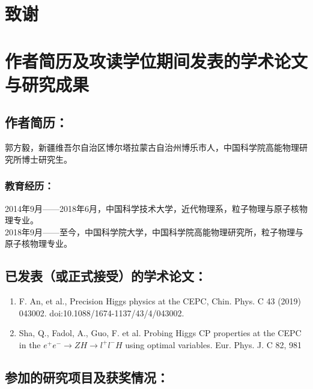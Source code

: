 \chapter[致谢]{致\quad 谢}%

\chapter{作者简历及攻读学位期间发表的学术论文与研究成果}

\section*{作者简历：}
郭方毅，新疆维吾尔自治区博尔塔拉蒙古自治州博乐市人，中国科学院高能物理研究所博士研究生。\\

\subsection*{教育经历：}
2014年9月——2018年6月，中国科学技术大学，近代物理系，粒子物理与原子核物理专业。\\

2018年9月——至今，中国科学院大学，中国科学院高能物理研究所，粒子物理与原子核物理专业。\\


\section*{已发表（或正式接受）的学术论文：}
{
\setlist[enumerate]{}%
\begin{enumerate}[nosep]
    \item F. An, et al., Precision Higgs physics at the CEPC, Chin. Phys. C 43 (2019) 043002. doi:10.1088/1674-1137/43/4/043002.
    \item Sha, Q., Fadol, A., Guo, F. et al. Probing Higgs CP properties at the CEPC in the $e^+ e^- \to ZH \to l^+ l^- H$ using optimal variables. Eur. Phys. J. C 82, 981
\end{enumerate}
}



\section*{参加的研究项目及获奖情况：}


\cleardoublepage[plain]%

